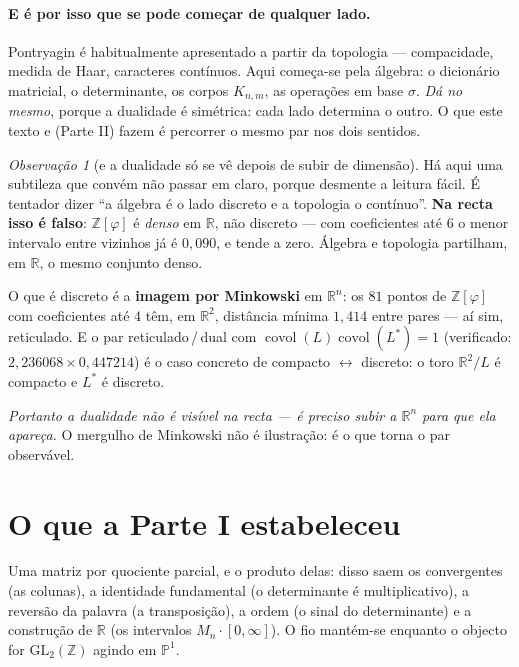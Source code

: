 \documentclass[11pt,a4paper]{article}
\theoremstyle{plain}
\theoremstyle{definition}
\theoremstyle{remark}
\newtheorem{obs}[teorema]{Observação}
\newcommand{\R}{\mathbb{R}}
\newcommand{\Z}{\mathbb{Z}}
\newcommand{\Pj}{\mathbb{P}^1}
\newcommand{\GL}{\mathrm{GL}}
\begin{document}
\paragraph{E é por isso que se pode começar de qualquer lado.} Pontryagin é habitualmente
apresentado a partir da topologia --- compacidade, medida de Haar, caracteres contínuos. Aqui
começa-se pela álgebra: o dicionário matricial, o determinante, os corpos $K_{n,m}$, as operações
em base $\sigma$. \emph{Dá no mesmo}, porque a dualidade é simétrica: cada lado determina o outro.
O que este texto e (Parte II) fazem é percorrer o mesmo par nos dois sentidos.

\begin{obs}[e a dualidade só se vê depois de subir de dimensão]\label{obs:densoDiscreto}
Há aqui uma subtileza que convém não passar em claro, porque desmente a leitura fácil. É tentador
dizer ``a álgebra é o lado discreto e a topologia o contínuo''. \textbf{Na recta isso é falso}:
$\Z[\varphi]$ é \emph{denso} em $\R$, não discreto --- com coeficientes até $6$ o menor intervalo
entre vizinhos já é $0{,}090$, e tende a zero. Álgebra e topologia partilham, em $\R$, o mesmo
conjunto denso.

O que é discreto é a \textbf{imagem por Minkowski} em $\R^n$: os $81$ pontos de $\Z[\varphi]$ com
coeficientes até $4$ têm, em $\R^2$, distância mínima $1{,}414$ entre pares --- aí sim, reticulado.
E o par reticulado\,/\,dual com $\operatorname{covol}(L)\operatorname{covol}(L^*) = 1$ (verificado:
$2{,}236068 \times 0{,}447214$) é o caso concreto de compacto $\leftrightarrow$ discreto: o toro
$\R^2/L$ é compacto e $L^*$ é discreto.

\emph{Portanto a dualidade não é visível na recta --- é preciso subir a $\R^n$ para que ela
apareça.} O mergulho de Minkowski não é ilustração: é o que torna o par observável.
\end{obs}

\section{O que a Parte I estabeleceu}\label{sec:conc}

Uma matriz por quociente parcial, e o produto delas: disso saem os convergentes (as colunas), a
identidade fundamental (o determinante é multiplicativo), a reversão da palavra (a transposição), a
ordem (o sinal do determinante) e a construção de $\R$ (os intervalos $M_n\cdot[0,\infty]$). O fio
mantém-se enquanto o objecto for $\GL_2(\Z)$ agindo em $\Pj$.
\end{document}
